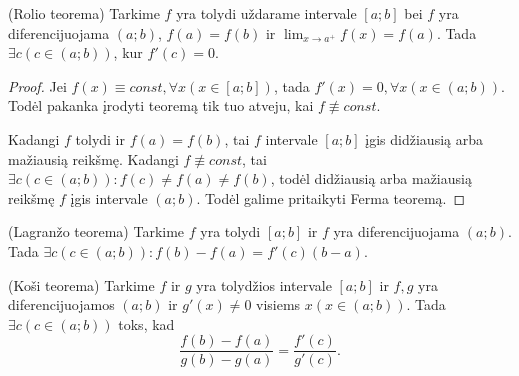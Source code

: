 \begin{prop}
  (Rolio teorema) Tarkime $f$ yra tolydi uždarame intervale $[a; b]$
  bei $f$ yra diferencijuojama $(a; b)$, $f(a) = f(b)$ ir 
  $\lim _{x \to a^{+}} f(x) = f(a)$. Tada 
  $\exists c (c \in (a; b))$, kur $f'(c) = 0$.

  \begin{proof}
    Jei $f(x) \equiv const, \forall x (x \in [a; b])$, tada 
    $f'(x) = 0, \forall x (x \in (a; b))$. Todėl pakanka įrodyti 
    teoremą tik tuo atveju, kai $f \not\equiv const$.

    Kadangi $f$ tolydi ir $f(a) = f(b)$, tai $f$ intervale
    $[a; b]$ įgis didžiausią arba mažiausią reikšmę. Kadangi
    $f \not\equiv const$, tai 
    $\exists c (c \in (a; b)) : f(c) \neq f(a) \neq f(b)$, todėl
    didžiausią arba mažiausią reikšmę $f$ įgis intervale $(a; b)$.
    Todėl galime pritaikyti Ferma teoremą.
  \end{proof}
\end{prop}

\begin{prop}
  \label{lagran_vid}
  (Lagranžo teorema) Tarkime $f$ yra tolydi $[a; b]$ ir $f$ yra 
  diferencijuojama $(a; b)$. Tada 
  $\exists c (c \in (a; b)) : f(b) - f(a) = f'(c)(b - a)$.
\end{prop}

\begin{prop}
  \label{kosi_vid}
  (Koši teorema) Tarkime $f$ ir $g$ yra tolydžios intervale $[a;b]$ ir
  $f, g$ yra diferencijuojamos $(a; b)$ ir $g'(x) \neq 0$ visiems 
  $x (x \in (a; b))$. Tada $\exists c (c \in (a; b))$ toks, kad
  \begin{equation*}
    \frac{f(b) - f(a)}{g(b) - g(a)} = \frac{f'(c)}{g'(c)}.
  \end{equation*}
\end{prop}
